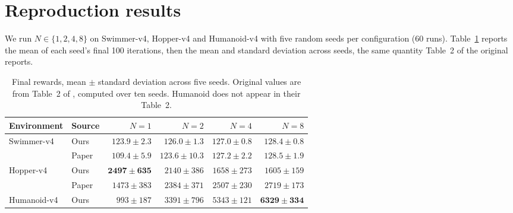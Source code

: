 \section{Reproduction results}
\label{sec:reproduction}

We run $N \in \{1,2,4,8\}$ on Swimmer-v4, Hopper-v4 and Humanoid-v4 with five
random seeds per configuration (60 runs). Table~\ref{tab:reproduction} reports
the mean of each seed's final 100 iterations, then the mean and standard
deviation across seeds, the same quantity Table~2 of the original reports.

\begin{table}[t]
  \centering
  \caption{Final rewards, mean $\pm$ standard deviation across five seeds.
  Original values are from Table~2 of \citet{lan2023fednpgadmm}, computed over
  ten seeds. Humanoid does not appear in their Table~2.}
  \label{tab:reproduction}
  \begin{tabular}{llrrrr}
    \toprule
    Environment & Source & $N=1$ & $N=2$ & $N=4$ & $N=8$ \\
    \midrule
    \multirow{2}{*}{Swimmer-v4}
      & Ours  & $\mathbf{123.9 \pm 2.3}$ & $126.0 \pm 1.3$ & $127.0 \pm 0.8$ & $\mathbf{128.4 \pm 0.8}$ \\
      & Paper & $109.4 \pm 5.9$  & $123.6 \pm 10.3$ & $127.2 \pm 2.2$ & $128.5 \pm 1.9$ \\
    \midrule
    \multirow{2}{*}{Hopper-v4}
      & Ours  & $\mathbf{2497 \pm 635}$ & $2140 \pm 386$ & $1658 \pm 273$ & $1605 \pm 159$ \\
      & Paper & $1473 \pm 383$ & $2384 \pm 371$ & $2507 \pm 230$ & $2719 \pm 173$ \\
    \midrule
    Humanoid-v4
      & Ours  & $993 \pm 187$ & $3391 \pm 796$ & $5343 \pm 121$ & $\mathbf{6329 \pm 334}$ \\
    \bottomrule
  \end{tabular}
\end{table}

